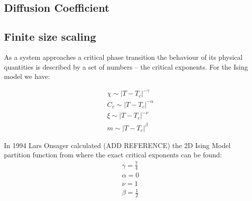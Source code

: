 \documentclass[twoside]{article}
\begin{document}
\begin{multicols}{2}
\subsection{Diffusion Coefficient}

\subsection{Finite size scaling}
As a system approaches a critical phase transition the behaviour of its physical quantities is described by a set of numbers -- the critical exponents. For the Ising model we have:

\begin{align}
&\chi \sim |T-T_c|^{-\gamma} \\
& C_v \sim |T-T_c|^{-\alpha} \\
& \xi \sim |T-T_c|^{-\nu} \\
& m \sim |T-T_c|^{\beta}
\end{align}

In 1994  Lars Onsager calculated (ADD REFERENCE) the 2D Ising Model partition function from where the exact critical exponents can be found:
\begin{align}
&\gamma = \frac{7}{4} \\
&\alpha = 0 \\
&\nu = 1\\
&\beta = \frac{1}{2} 
\end{align}

\end{multicols}
\end{document}

